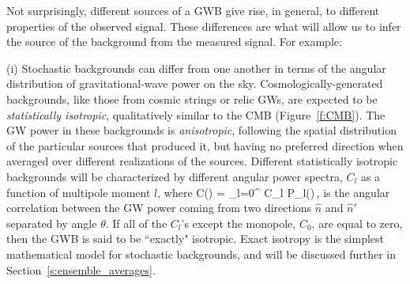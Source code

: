 Not surprisingly, different sources of a GWB give
rise, in general, to different properties of the 
observed signal.
These differences are what will allow us to infer 
the source of the background from the measured signal.
For example:

(i) Stochastic backgrounds can differ from one another 
in terms of the angular distribution of 
gravitational-wave power on the sky.
Cosmologically-generated backgrounds, like those from 
cosmic strings or relic GWs,
are expected to be {\em statistically isotropic},
qualitatively similar to the CMB (Figure~\ref{f:CMB}).
The GW power in these backgrounds is {\em anisotropic}, 
following the spatial distribution of the particular
sources that produced it, but having no preferred 
direction when averaged over different realizations 
of the sources.
Different statistically isotropic backgrounds will
be characterized by different angular power spectra,
$C_l$ as a function of multipole moment $l$, where
%
\be
C(\theta) = \sum_{l=0}^\infty {} 
C_l P_l(\cos\theta)\,,
\label{e:legendre_series}
\ee
%
is the angular correlation between the GW power 
coming from two directions $\hat n$ and $\hat n'$
separated by angle $\theta$.
If all of the $C_l$'s except the monopole, $C_0$, 
are equal to zero, then the GWB is said to be 
``exactly" isotropic.
Exact isotropy is the simplest mathematical model 
for stochastic backgrounds, and will be discussed
further in Section~\ref{s:ensemble_averages}.

